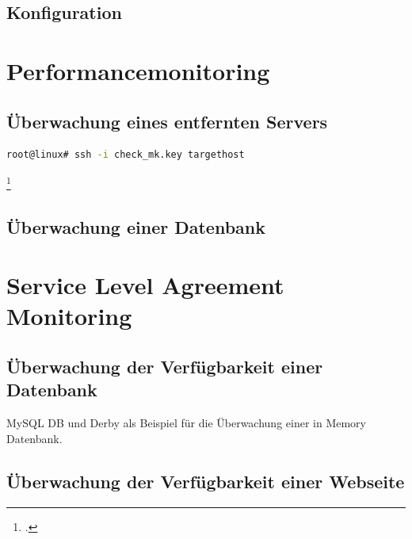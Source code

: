 \documentclass[12pt,a4paper,parskip]{scrreprt}
\begin{document}
	
	
	\subsection{Konfiguration}
	\section{Performancemonitoring}
	\subsection{Überwachung eines entfernten Servers}
	\begin{lstlisting}[language=bash]
	root@linux# ssh -i check_mk.key targethost
	\end{lstlisting} \footcite{checkmkCheckBySSH2015}
	\subsection{Überwachung einer Datenbank}
	\section{Service Level Agreement Monitoring}
	\subsection{Überwachung der Verfügbarkeit einer Datenbank}
	MySQL DB und Derby als Beispiel für die Überwachung einer in Memory Datenbank.
	\subsection{Überwachung der Verfügbarkeit einer Webseite}
	\begingroup
	\nocite{*} %
	\printbibliography 
	\endgroup
	\printglossary[title=Abkürzungsverzeichnis, type=\acronymtype] %
	\printglossary[title=Glossar]
	\listoffigures %
	\listoftables %
\end{document}
